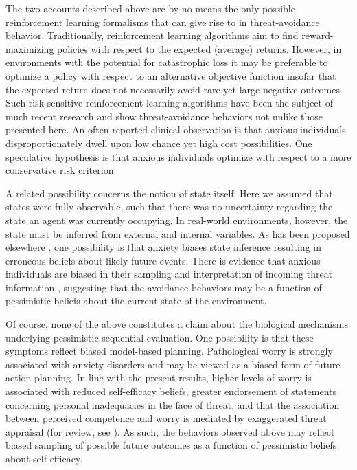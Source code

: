 \documentclass[11pt]{article} %
\begin{document}
The two accounts described above are by no means the only possible reinforcement learning formalisms that can give rise to in threat-avoidance behavior. Traditionally, reinforcement learning algorithms aim to find reward-maximizing policies with respect to the expected (average) returns. However, in environments with the potential for catastrophic loss it may be preferable to optimize a policy with respect to an alternative objective function insofar that the expected return does not necessarily avoid rare yet large negative outcomes. Such risk-sensitive reinforcement learning algorithms have been the subject of much recent research \cite{geibel2005, morimura2012} and show threat-avoidance behaviors not unlike those presented here. An often reported clinical observation is that anxious individuals disproportionately dwell upon low chance yet high cost possibilities. \cite{Miceli2005} One speculative hypothesis is that anxious individuals optimize with respect to a more conservative risk criterion. 

A related possibility concerns the notion of state itself. Here we assumed that states were fully observable, such that there was no uncertainty regarding the state an agent was currently occupying. In real-world environments, however, the state must be inferred from external and internal variables. As has been proposed elsewhere \cite{Paulus2012}, one possibility is that anxiety biases state inference resulting in erroneous beliefs about likely future events. There is evidence that anxious individuals are biased in their sampling and interpretation of incoming threat information \cite{Paulus2012}, suggesting that the avoidance behaviors may be a function of pessimistic beliefs about the current state of the environment.  

Of course, none of the above constitutes a claim about the biological mechanisms underlying pessimistic sequential evaluation. One possibility is that these symptoms reflect biased model-based planning. Pathological worry is strongly associated with anxiety disorders and may be viewed as a biased form of future action planning. In line with the present results, higher levels of worry is associated with reduced self-efficacy beliefs, greater endorsement of statements concerning personal inadequacies in the face of threat, and that the association between perceived competence and worry is mediated by exaggerated threat appraisal (for review, see \cite{Berenbaum2010}). As such, the behaviors observed above may reflect biased sampling of possible future outcomes as a function of pessimistic beliefs about self-efficacy. 
\end{document}
